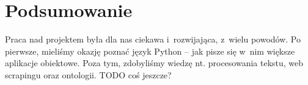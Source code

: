 \documentclass[11pt,a4paper]{article}
\begin{document}
\section{Podsumowanie}
Praca nad projektem była dla nas ciekawa i~rozwijająca, z~wielu powodów. Po pierwsze, mieliśmy okazję poznać język Python -- jak pisze się w~nim większe aplikacje obiektowe. Poza tym, zdobyliśmy wiedzę nt. procesowania tekstu, web scrapingu oraz ontologii. TODO coś jeszcze?

%
\end{document}
